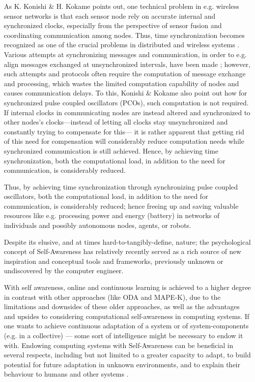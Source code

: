 As K. Konishi \& H. Kokame \cite{konishi_kokame} points out, one technical problem in e.g. wireless sensor networks is that each sensor node rely on accurate internal and synchronized clocks, especially from the perspective of sensor fusion and coordinating communication among nodes. Thus, time synchronization becomes recognized as one of the crucial problems in distributed and wireless systems \cite{tungvinte_sync_protocols}. Various attempts at synchronizing messages and communication, in order to e.g. align messages exchanged at unsynchronized intervals, have been made \cite{tungvinte_sync_protocols}; however, such attempts and protocols often require the computation of message exchange and processing, which wastes the limited computation capability of nodes and causes communication delays. To this, Konishi \& Kokame \cite{konishi_kokame} also point out how for synchronized pulse coupled oscillators (PCOs), such computation is not required. If internal clocks in communicating nodes are instead altered and synchronized to other nodes's clocks—instead of letting all clocks stay unsynchronized and constantly trying to compensate for this— it is rather apparent that getting rid of this need for compensation will considerably reduce computation needs while synchronized communication is still achieved. Hence, by achieving time synchronization, both the computational load, in addition to the need for communication, is considerably reduced.

Thus, by achieving time synchronization \cite{tungvinte_sync_protocols} through synchronizing pulse coupled oscillators, both the computational load, in addition to the need for communication, is considerably reduced; hence freeing up and saving valuable resources like e.g. processing power and energy (battery) in networks of individuals and possibly autonomous nodes, agents, or robots.

Despite its elusive, and at times hard-to-tangibly-define, nature; the psychological concept of Self-Awareness has relatively recently served as a rich source of new inspiration and conceptual tools and frameworks, previously unknown or undiscovered by the computer engineer.

With self awareness, online and continuous learning is achieved to a higher degree in contrast with other approaches (like ODA and MAPE-K), due to the limitations and downsides of these older approaches, as well as the advantages and upsides to considering computational self-awareness in computing systems. If one wants to achieve continuous adaptation of a system or of system-components (e.g. in a collective) — some sort of intelligence might be necessary to endow it with. Endowing computing systems with Self-Awareness can be beneficial in several respects, including but not limited to a greater capacity to adapt, to build potential for future adaptation in unknown environments, and to explain their behaviour to humans and other systems \cite{sacs17_ch3}.

